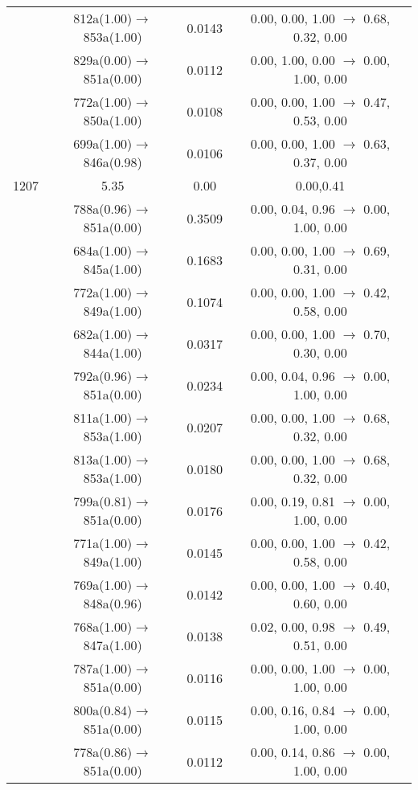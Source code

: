 \documentclass[10pt,a4paper]{article}
\begin{document}
\begin{longtable}{c|c|c|c}
 	& 812a(1.00)$\rightarrow$853a(1.00) &	 0.0143 &	 0.00, 0.00, 1.00 $\rightarrow$ 0.68, 0.32, 0.00 \\ 
 	& 829a(0.00)$\rightarrow$851a(0.00) &	 0.0112 &	 0.00, 1.00, 0.00 $\rightarrow$ 0.00, 1.00, 0.00 \\ 
 	& 772a(1.00)$\rightarrow$850a(1.00) &	 0.0108 &	 0.00, 0.00, 1.00 $\rightarrow$ 0.47, 0.53, 0.00 \\ 
 	& 699a(1.00)$\rightarrow$846a(0.98) &	 0.0106 &	 0.00, 0.00, 1.00 $\rightarrow$ 0.63, 0.37, 0.00 \\ 
 \hline1207 &	 5.35 &	 0.00 &	 0.00,0.41 \\ 
  	& 788a(0.96)$\rightarrow$851a(0.00) &	 0.3509 &	 0.00, 0.04, 0.96 $\rightarrow$ 0.00, 1.00, 0.00 \\ 
 	& 684a(1.00)$\rightarrow$845a(1.00) &	 0.1683 &	 0.00, 0.00, 1.00 $\rightarrow$ 0.69, 0.31, 0.00 \\ 
 	& 772a(1.00)$\rightarrow$849a(1.00) &	 0.1074 &	 0.00, 0.00, 1.00 $\rightarrow$ 0.42, 0.58, 0.00 \\ 
 	& 682a(1.00)$\rightarrow$844a(1.00) &	 0.0317 &	 0.00, 0.00, 1.00 $\rightarrow$ 0.70, 0.30, 0.00 \\ 
 	& 792a(0.96)$\rightarrow$851a(0.00) &	 0.0234 &	 0.00, 0.04, 0.96 $\rightarrow$ 0.00, 1.00, 0.00 \\ 
 	& 811a(1.00)$\rightarrow$853a(1.00) &	 0.0207 &	 0.00, 0.00, 1.00 $\rightarrow$ 0.68, 0.32, 0.00 \\ 
 	& 813a(1.00)$\rightarrow$853a(1.00) &	 0.0180 &	 0.00, 0.00, 1.00 $\rightarrow$ 0.68, 0.32, 0.00 \\ 
 	& 799a(0.81)$\rightarrow$851a(0.00) &	 0.0176 &	 0.00, 0.19, 0.81 $\rightarrow$ 0.00, 1.00, 0.00 \\ 
 	& 771a(1.00)$\rightarrow$849a(1.00) &	 0.0145 &	 0.00, 0.00, 1.00 $\rightarrow$ 0.42, 0.58, 0.00 \\ 
 	& 769a(1.00)$\rightarrow$848a(0.96) &	 0.0142 &	 0.00, 0.00, 1.00 $\rightarrow$ 0.40, 0.60, 0.00 \\ 
 	& 768a(1.00)$\rightarrow$847a(1.00) &	 0.0138 &	 0.02, 0.00, 0.98 $\rightarrow$ 0.49, 0.51, 0.00 \\ 
 	& 787a(1.00)$\rightarrow$851a(0.00) &	 0.0116 &	 0.00, 0.00, 1.00 $\rightarrow$ 0.00, 1.00, 0.00 \\ 
 	& 800a(0.84)$\rightarrow$851a(0.00) &	 0.0115 &	 0.00, 0.16, 0.84 $\rightarrow$ 0.00, 1.00, 0.00 \\ 
 	& 778a(0.86)$\rightarrow$851a(0.00) &	 0.0112 &	 0.00, 0.14, 0.86 $\rightarrow$ 0.00, 1.00, 0.00 \\ 

\end{longtable}
\end{document}
